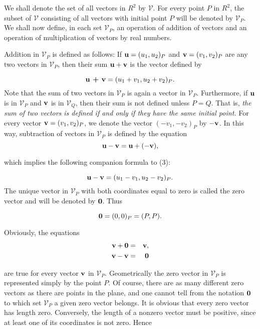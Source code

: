 We shall denote the set of all vectors in $R^2$ by $\mathcal{V}$. For every point $P$ in $R^2$, the subset of $\mathcal{V}$ consisting of all vectors with initial point $P$ will be denoted by
$\mathcal{V}_P$. We shall now define, in each set $\mathcal{V}_P$, an operation of addition of vectors and an operation of multiplication of vectors by real numbers.

Addition in $\mathcal{V}_P$ is defined as follows: If $\mbox{\bf{u}} = (u_1, u_2)_P$ and $\mbox{\bf{v}} = (v_1, v_2)_P$ are any two vectors in $\mathcal{V}_P$, then their sum $\mbox{\bf{u}} + \mbox{\bf{v}}$ is the vector defined by

\begin{equation}
\mbox{\bf{u} + \bf{v}} = (u_1 +v_1,u_2 + v_2)_P.   
\label{eq10.3.3}
\end{equation}
\noindent Note that the sum of two vectors in $\mathcal{V}_P$ is again a vector in $\mathcal{V}_P$. Furthermore, if $\mbox{\bf{u}}$ is in $\mathcal{V}_P$ and $\mbox{\bf{v}}$ is in $\mathcal{V}_Q$, then their sum is not defined unless $P = Q$. That is, \textit{the sum of two vectors is defined if and only if they have the same initial point.}  For every vector $\mbox{\bf{v}} = (v_1, v_2)_P$, we denote the vector $(-v_1, -v_2)_P$ by $-\mbox{\bf{v}}$. In this way, subtraction of vectors in $\mathcal{V}_P$ is defined by the equation
$$
\mbox{\bf{u}} - \mbox{\bf{v}} = \mbox{\bf{u}} + (-\mbox{\bf{v}}), 
$$

\noindent which implies the following companion formula to (3):

\begin{equation}
\mbox{\bf{u}} - \mbox{\bf{v}} = (u_1 - v_1, u_2 - v_2)_P.  
\label{eq10.3.4}
\end{equation}
\noindent The unique vector in $\mathcal{V}_P$ with both coordinates equal to zero is called the zero vector and will be denoted by $\mbox{\bf{0}}$. Thus

$$
\mbox{\bf{0}} = (0, 0)_P = (P, P).
$$

\noindent Obviously, the equations
\begin{eqnarray*}
\mbox{\bf{v}} + \mbox{\bf{0}} &=& \mbox{\bf{v}}, \\
\mbox{\bf{v}}  - \mbox{\bf{v}} &=& \mbox{\bf{0}}
\end{eqnarray*}

\noindent are true for every vector $\mbox{\bf{v}}$ in $\mathcal{V}_P$. Geometrically the zero vector in $\mathcal{V}_P$ is represented simply by the point $P$. Of course, there are as many different zero vectors as there are points in the plane, and one cannot tell from the notation $\mbox{\bf{0}}$ to which set $\mathcal{V}_P$ a given zero vector belongs. It is obvious that every zero vector has length zero. Conversely, the length of a nonzero vector must be positive, since at least one of its coordinates is not zero. Hence

